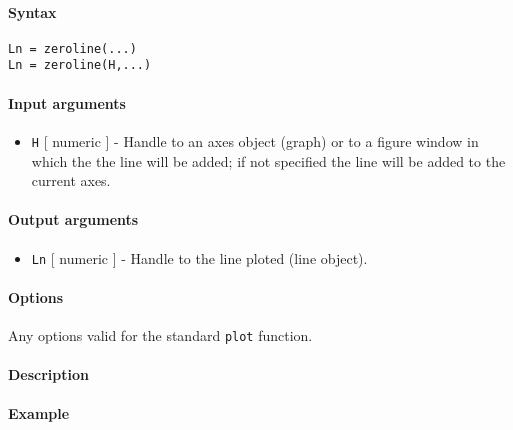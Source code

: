 


	\paragraph{Syntax}\label{syntax}

\begin{verbatim}
Ln = zeroline(...)
Ln = zeroline(H,...)
\end{verbatim}

\paragraph{Input arguments}\label{input-arguments}

\begin{itemize}
\itemsep1pt\parskip0pt
\item
  \texttt{H} {[} numeric {]} - Handle to an axes object (graph) or to a
  figure window in which the the line will be added; if not specified
  the line will be added to the current axes.
\end{itemize}

\paragraph{Output arguments}\label{output-arguments}

\begin{itemize}
\itemsep1pt\parskip0pt
\item
  \texttt{Ln} {[} numeric {]} - Handle to the line ploted (line object).
\end{itemize}

\paragraph{Options}\label{options}

Any options valid for the standard \texttt{plot} function.

\paragraph{Description}\label{description}

\paragraph{Example}\label{example}


